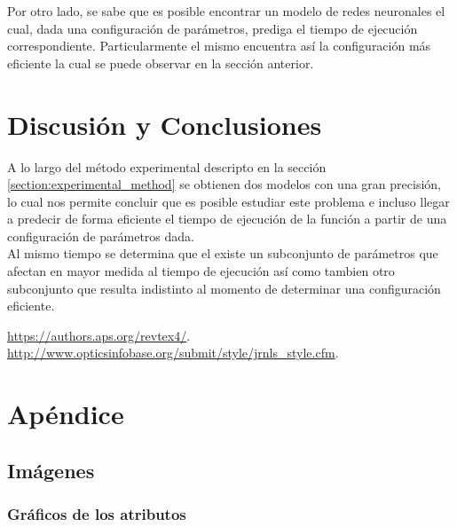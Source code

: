 \documentclass[osajnl,twocolumn,showpacs,superscriptaddress,10pt]{revtex4-1} %
\begin{document}
Por otro lado, se sabe que es posible encontrar un modelo de redes neuronales el cual, dada una configuración de parámetros, prediga el tiempo de ejecución correspondiente. Particularmente el mismo encuentra así la configuración más eficiente la cual se puede observar en la sección anterior. \\

\section{Discusión y Conclusiones}

A lo largo del método experimental descripto en la sección \ref{section:experimental_method} se obtienen dos modelos con una gran precisión, lo cual nos permite concluir que es posible estudiar este problema e incluso llegar a predecir de forma eficiente el tiempo de ejecución de la función a partir de una configuración de parámetros dada. \\

Al mismo tiempo se determina que el existe un subconjunto de parámetros que afectan en mayor medida al tiempo de ejecución así como tambien otro subconjunto que resulta indistinto al momento de determinar una configuración eficiente. \\

\begin{thebibliography}{99}

 \url{https://authors.aps.org/revtex4/}.
 \url{http://www.opticsinfobase.org/submit/style/jrnls_style.cfm}.

\end{thebibliography}

\clearpage

\onecolumngrid

\section{Apéndice}

\subsection{Imágenes} \label{apendix:images}

\subsubsection{Gráficos de los atributos} \label{apendix:images:attr}
\end{document}
